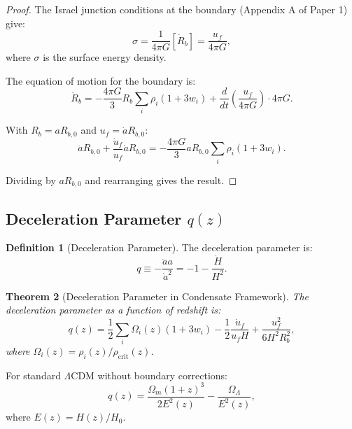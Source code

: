 \documentclass[11pt,a4paper]{article}
\newcommand{\OmegaLam}{\ensuremath{\Omega_\Lambda}}
\newcommand{\OmegaM}{\ensuremath{\Omega_m}}
\newtheorem{theorem}{Theorem}[section]
\theoremstyle{definition}
\newtheorem{definition}[theorem]{Definition}
\theoremstyle{remark}
\begin{document}
\begin{proof}
The Israel junction conditions at the boundary (Appendix A of Paper 1) give:
\begin{equation}
\sigma = \frac{1}{4\pi G}[\dot{R}_b] = \frac{u_f}{4\pi G},
\end{equation}
where $\sigma$ is the surface energy density.

The equation of motion for the boundary is:
\begin{equation}
\ddot{R}_b = -\frac{4\pi G}{3}R_b \sum_i \rho_i(1 + 3w_i) + \frac{d}{dt}\left(\frac{u_f}{4\pi G}\right)\cdot 4\pi G.
\end{equation}

With $R_b = aR_{b,0}$ and $u_f = \dot{a}R_{b,0}$:
\begin{equation}
\ddot{a}R_{b,0} + \frac{\dot{u}_f}{u_f}\dot{a}R_{b,0} = -\frac{4\pi G}{3}aR_{b,0}\sum_i \rho_i(1 + 3w_i).
\end{equation}

Dividing by $aR_{b,0}$ and rearranging gives the result. \qedhere
\end{proof}

\subsection{Deceleration Parameter $q(z)$}
\label{sec:deceleration}

\begin{definition}[Deceleration Parameter]
The deceleration parameter is:
\begin{equation}
q \equiv -\frac{\ddot{a}a}{\dot{a}^2} = -1 - \frac{\dot{H}}{H^2}.
\end{equation}
\end{definition}

\begin{theorem}[Deceleration Parameter in Condensate Framework]
\label{thm:q_condensate}
The deceleration parameter as a function of redshift is:
\begin{equation}
\label{eq:q_z}
\boxed{q(z) = \frac{1}{2}\sum_i \Omega_i(z)(1 + 3w_i) - \frac{1}{2}\frac{\dot{u}_f}{u_f H} + \frac{u_f^2}{6H^2 R_b^2},}
\end{equation}
where $\Omega_i(z) = \rho_i(z)/\rho_{\mathrm{crit}}(z)$.
\end{theorem}

For standard $\Lambda$CDM without boundary corrections:
\begin{equation}
q(z) = \frac{\OmegaM(1+z)^3}{2E^2(z)} - \frac{\OmegaLam}{E^2(z)},
\end{equation}
where $E(z) = H(z)/H_0$.
\end{document}
